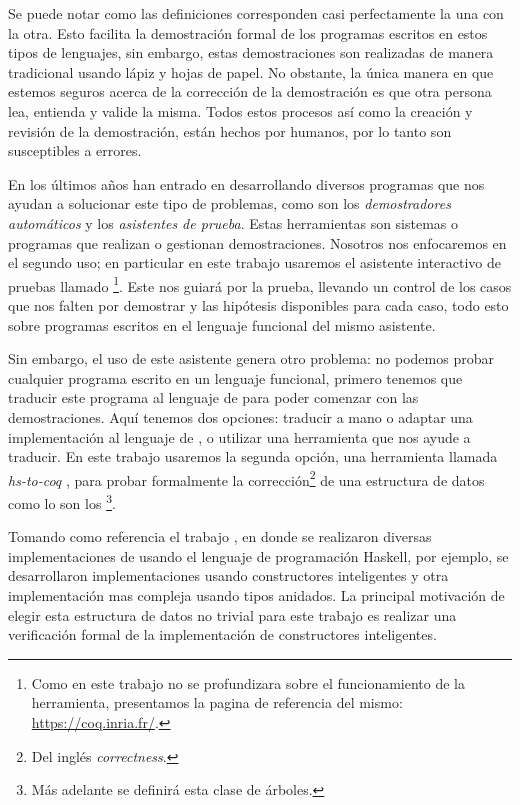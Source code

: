 Se puede notar como las definiciones corresponden casi perfectamente la una con la otra. Esto 
facilita la demostraci\'on formal de los programas escritos en estos tipos de lenguajes, sin
embargo, estas demostraciones son realizadas de manera tradicional usando l\'apiz y hojas de papel.
No obstante, la \'unica manera en que estemos seguros acerca de la correcci\'on de la
demostraci\'on es que otra persona lea, entienda y valide la misma. Todos estos procesos as\'i como 
la creaci\'on y revisi\'on de la demostraci\'on, están hechos por humanos, por lo tanto son 
susceptibles a errores.

En los últimos años han entrado en desarrollando diversos programas que nos ayudan a solucionar este
tipo de problemas, como son los \textit{demostradores autom\'aticos} y los \textit{asistentes de
prueba}. Estas herramientas son sistemas o programas que realizan o gestionan demostraciones. 
Nosotros nos enfocaremos en el segundo uso; en particular en este trabajo usaremos el asistente 
interactivo de pruebas llamado {\coq}\footnote{Como en este trabajo no se profundizara sobre el 
funcionamiento de la herramienta, presentamos la pagina de referencia del mismo: 
\url{https://coq.inria.fr/}.}. Este nos guiar\'a por la prueba, llevando un control de 
los casos que nos falten por demostrar y las hip\'otesis disponibles para cada caso, todo esto sobre 
programas escritos en el lenguaje funcional del mismo asistente.

Sin embargo, el uso de este asistente genera otro problema: no podemos probar cualquier programa
escrito en un lenguaje funcional, primero tenemos que traducir este programa al lenguaje de {\coq}
para poder comenzar con las demostraciones. Aquí tenemos dos opciones: traducir a mano o adaptar 
una implementación al lenguaje de {\coq}, o utilizar una herramienta que nos ayude a traducir. En 
este trabajo usaremos la segunda opci\'on, una herramienta llamada \textit{hs-to-coq} \cite{thrc}, 
para probar formalmente la correcci\'on\footnote{Del ingl\'es \textit{correctness}.} de una estructura 
de datos como lo son los {\arns}\footnote{M\'as adelante se definir\'a esta clase de \'arboles.}.

Tomando como referencia el trabajo \cite{tesisG}, en donde se realizaron diversas implementaciones 
de {\arns} usando el lenguaje de programaci\'on Haskell, por ejemplo, se desarrollaron 
implementaciones usando constructores inteligentes y otra implementaci\'on mas compleja usando tipos 
anidados. La principal motivación de elegir esta estructura de datos no trivial para este trabajo es
realizar una verificaci\'on formal de la implementaci\'on de constructores inteligentes.

